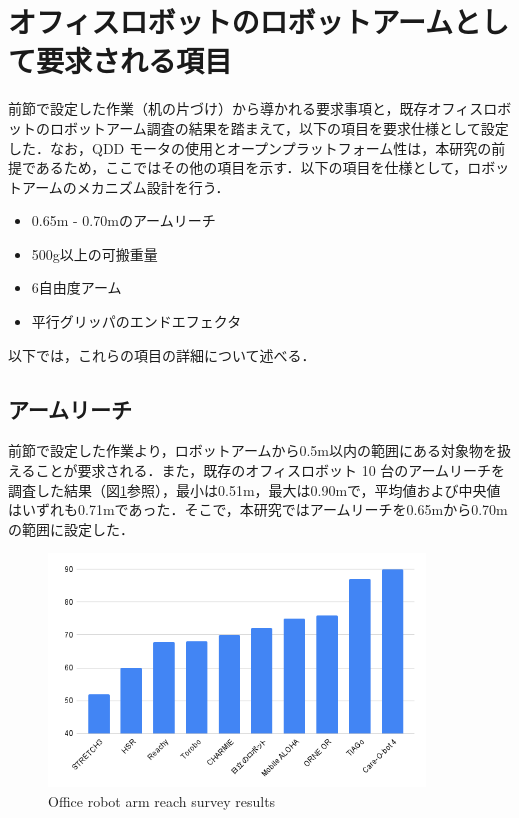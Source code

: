\section{オフィスロボットのロボットアームとして要求される項目}
前節で設定した作業（机の片づけ）から導かれる要求事項と，既存オフィスロボットのロボットアーム調査の結果を踏まえて，以下の項目を要求仕様として設定した．なお，QDD モータの使用とオープンプラットフォーム性は，本研究の前提であるため，ここではその他の項目を示す．以下の項目を仕様として，ロボットアームのメカニズム設計を行う．
\begin{itemize}
  \item 0.65m - 0.70mのアームリーチ
  \item 500g以上の可搬重量
  \item 6自由度アーム
  \item 平行グリッパのエンドエフェクタ
\end{itemize}
以下では，これらの項目の詳細について述べる．

\subsection{アームリーチ}
前節で設定した作業より，ロボットアームから0.5m以内の範囲にある対象物を扱えることが要求される．また，既存のオフィスロボット 10 台のアームリーチを調査した結果（図\ref{fig:reach}参照），最小は0.51m，最大は0.90mで，平均値および中央値はいずれも0.71mであった．そこで，本研究ではアームリーチを0.65mから0.70mの範囲に設定した．
\begin{figure}[h]
  \centering
  \includegraphics[width=10cm]{images/2syou/reach.png}
  \caption{Office robot arm reach survey results}
  \label{fig:reach}
\end{figure}

